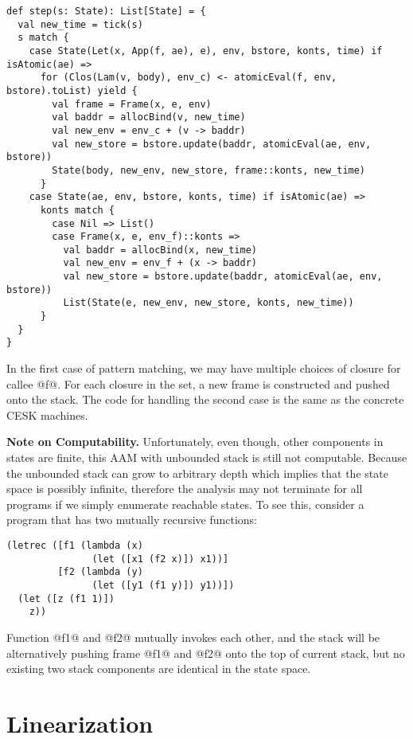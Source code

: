 \documentclass[acmsmall,review,anonymous]{acmart}\settopmatter{printfolios=true,printccs=false,printacmref=false}
\begin{document}
\begin{lstlisting}
def step(s: State): List[State] = {
  val new_time = tick(s)
  s match {
    case State(Let(x, App(f, ae), e), env, bstore, konts, time) if isAtomic(ae) =>
      for (Clos(Lam(v, body), env_c) <- atomicEval(f, env, bstore).toList) yield {
        val frame = Frame(x, e, env)
        val baddr = allocBind(v, new_time)
        val new_env = env_c + (v -> baddr)
        val new_store = bstore.update(baddr, atomicEval(ae, env, bstore))
        State(body, new_env, new_store, frame::konts, new_time)
      }
    case State(ae, env, bstore, konts, time) if isAtomic(ae) =>
      konts match {
        case Nil => List()
        case Frame(x, e, env_f)::konts =>
          val baddr = allocBind(x, new_time)
          val new_env = env_f + (x -> baddr)
          val new_store = bstore.update(baddr, atomicEval(ae, env, bstore))
          List(State(e, new_env, new_store, konts, new_time))
      }
  }
}
\end{lstlisting}

In the first case of pattern matching, we may have multiple choices of closure for callee @f@.
For each closure in the set, a new frame is constructed and pushed onto the stack.
The code for handling the second case is the same as the concrete CESK machines.

\textbf{Note on Computability.}
Unfortunately, even though, other components in states are finite,
this AAM with unbounded stack is still not computable.
Because the unbounded stack can grow to arbitrary depth which implies that the state space is possibly
infinite, therefore the analysis may not terminate for all programs if we simply enumerate reachable states.
To see this, consider a program that has two mutually recursive functions:

\begin{lstlisting}
(letrec ([f1 (lambda (x)
               (let ([x1 (f2 x)]) x1))]
         [f2 (lambda (y)
               (let ([y1 (f1 y)]) y1))])
  (let ([z (f1 1)])
    z))
\end{lstlisting}

Function @f1@ and @f2@ mutually invokes each other, and the stack will be
alternatively pushing frame @f1@ and @f2@ onto the top of current stack,
but no existing two stack components are identical in the state space.

\section{Linearization} \label{linear}
\end{document}

